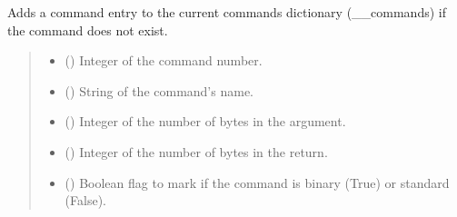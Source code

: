 \documentclass[letterpaper,10pt,english]{sphinxmanual}
\begin{document}
\begin{fulllineitems}
\begin{fulllineitems}
\label{\detokenize{PodCommands:PodCommands.POD_Commands.AddCommand}}
\pysigstartsignatures
{}
\pysigstopsignatures
\sphinxAtStartPar
Adds a command entry to the current commands dictionary (\_\_commands) if the command does         not exist.
\begin{quote}\begin{description}
\begin{itemize}
\item {} 
\sphinxAtStartPar
{} () \textendash{} Integer of the command number.

\item {} 
\sphinxAtStartPar
{} () \textendash{} String of the command’s name.

\item {} 
\sphinxAtStartPar
{} (\sphinxstyleliteralemphasis{\sphinxupquote{{[}}}\sphinxstyleliteralemphasis{\sphinxupquote{{]}}}) \textendash{} Integer of the number of bytes in the argument.

\item {} 
\sphinxAtStartPar
{} (\sphinxstyleliteralemphasis{\sphinxupquote{{[}}}\sphinxstyleliteralemphasis{\sphinxupquote{{]}}}) \textendash{} Integer of the number of bytes in the return.

\item {} 
\sphinxAtStartPar
{} () \textendash{} Boolean flag to mark if the command is binary (True) or standard (False).


\end{itemize}
\end{description}
\end{quote}
\end{fulllineitems}
\end{fulllineitems}
\end{document}
